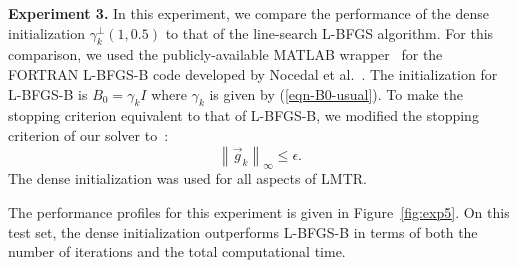 

\bigskip
\noindent
{\bf Experiment 3.}  In this experiment, we compare the performance of the
dense initialization
$\gamma_k^{\perp}(1,0.5)$
to that of the line-search {\small L-BFGS} algorithm.
 For this comparison, we used the publicly-available {\small MATLAB}                
wrapper~\cite{BeckerLbfgs} for the {\small FORTRAN} {\small L-BFGS-B} code     
developed by Nocedal et al.~\cite{ZhuByrdNocedal97}.  The initialization for {\small L-BFGS-B} is $B_0=\gamma_kI$ where             
$\gamma_k$ is given by (\ref{eqn-B0-usual}).           
To make the stopping criterion equivalent to that of {\small L-BFGS-B},
we modified the stopping criterion of our solver         
to~\cite{ZhuByrdNocedal97}:                                                   
      \begin{equation*}                                                       
               \left\| \vec{g}_k \right\|_{\infty} \le \epsilon.              
       \end{equation*}                                                         
The dense initialization was used for all aspects of {\small LMTR}.
         
         The performance profiles for this experiment is given in Figure~\ref{fig:exp5}.
         On this test set, the dense initialization outperforms {\small L-BFGS-B}
         in terms of both the number of iterations and the total computational time.
         


